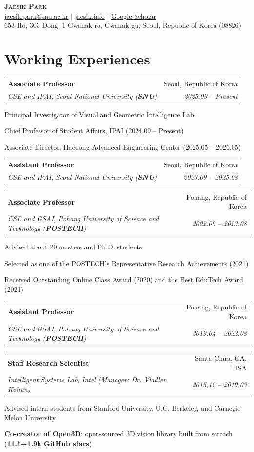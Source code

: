 \documentclass[letterpaper,11pt]{article}
\makeatletter
\newcommand{\resumeItem}[1]{
  \small{
  \item{#1 \vspace{-2pt}}
  }
}
\newcommand{\resumeSubheading}[4]{
  \vspace{-2pt}\item
    \begin{tabular*}{0.97\textwidth}[t]{l@{\extracolsep{\fill}}r}
      \textbf{#1} & #2 \\
      \textit{\small#3} & \textit{\small #4} \\
    \end{tabular*}\vspace{-7pt}
}
\newcommand{\resumeSubHeadingListStart}{\begin{itemize}[leftmargin=0.15in, label={}]}
\newcommand{\resumeSubHeadingListEnd}{\end{itemize}}
\newcommand{\resumeItemListStart}{\begin{itemize}}
\newcommand{\resumeItemListEnd}{\end{itemize}\vspace{-5pt}}
\makeatother
\begin{document}
\begin{center}
    \textbf{\Huge \scshape Jaesik Park} \\ \vspace{3pt}
    \small \href{mailto:jaesik.park@snu.ac.kr}{\underline{jaesik.park@snu.ac.kr}} $|$ 
    \href{http://jaesik.info}{\underline{jaesik.info}} $|$ 
    \href{https://scholar.google.com/citations?user=_3q6KBIAAAAJ&hl=en}{\underline{Google Scholar}} \\
    \footnotesize{653 Ho, 303 Dong, 1 Gwanak-ro, Gwanak-gu, Seoul, Republic of Korea (08826)}
\end{center}

\section{Working Experiences}
  \resumeSubHeadingListStart
    \resumeSubheading
      {Associate Professor}{Seoul, Republic of Korea}
      {CSE and IPAI, Seoul National University \textnormal{(\textbf{SNU})}}{2025.09 -- Present}
      \resumeItemListStart
        \resumeItem{Principal Investigator of Visual and Geometric Intelligence Lab.}
        \resumeItem{Chief Professor of Student Affairs, IPAI (2024.09 -- Present)}
        \resumeItem{Associate Director, Haedong Advanced Engineering Center (2025.05 -- 2026.05)}
      \resumeItemListEnd
    \resumeSubheading
      {Assistant Professor}{Seoul, Republic of Korea}
      {CSE and IPAI, Seoul National University \textnormal{(\textbf{SNU})}}{2023.09 -- 2025.08}
    \resumeSubheading
      {Associate Professor}{Pohang, Republic of Korea}
      {CSE and GSAI, Pohang University of Science and Technology \textnormal{(\textbf{POSTECH})}}{2022.09 -- 2023.08}
      \resumeItemListStart
        \resumeItem{Advised about 20 masters and Ph.D. students}
        \resumeItem{Selected as one of the POSTECH's Representative Research Achievements (2021)}
        \resumeItem{Received Outstanding Online Class Award (2020) and the Best EduTech Award (2021)}
      \resumeItemListEnd
    \resumeSubheading
      {Assistant Professor}{Pohang, Republic of Korea}
      {CSE and GSAI, Pohang University of Science and Technology \textnormal{(\textbf{POSTECH})}}{2019.04 -- 2022.08}
    \resumeSubheading
      {Staff Research Scientist}{Santa Clara, CA, USA}
      {Intelligent Systems Lab, Intel (Manager: Dr. Vladlen Koltun)}{2015.12 -- 2019.03}
        \resumeItemListStart
          \resumeItem{Advised intern students from Stanford University, U.C. Berkeley, and Carnegie Melon University}
          \resumeItem{\textbf{Co-creator of Open3D}: open-sourced 3D vision library built from scratch (\textbf{11.5+1.9k GitHub stars})}
        \resumeItemListEnd
  \resumeSubHeadingListEnd
\end{document}
